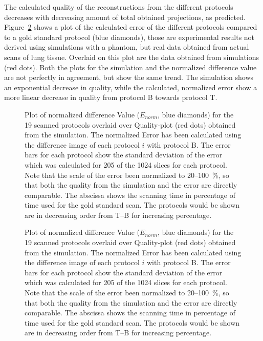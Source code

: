 The calculated quality of the reconstructions from the different protocols decreases with decreasing amount of total obtained projections, as predicted. Figure~\ref{fig:NormalizedErrorPlot} shows a plot of the calculated error of the different protocols compared to a gold standard protocol (blue diamonds), those are experimental results not derived using simulations with a phantom, but real data obtained from actual scans of lung tissue. Overlaid on this plot are the data obtained from simulations (red dots). Both the plots for the simulation and the normalized difference value are not perfectly in agreement, but show the same trend. The simulation shows an exponential decrease in quality, while the calculated, normalized error show a more linear decrease in quality from protocol B towards protocol T.

\ifiucr
	\begin{figure}%
		\centering%
		\caption{Plot of normalized difference Value ($E_{norm}$, blue diamonds) for the 19 scanned protocols overlaid over Quality-plot (red dots) obtained from the simulation. The normalized Error has been calculated using the difference image of each protocol $i$ with protocol B. The error bars for each protocol show the standard deviation of the error which was calculated for 205 of the 1024 slices for each protocol. Note that the scale of the error been normalized to 20--\SI{100}{\percent}, so that both the quality from the simulation and the error are directly comparable. The abscissa shows the scanning time in percentage of time used for the gold standard scan. The protocols would be shown are in decreasing order from T--B for increasing percentage.}%
		\label{fig:NormalizedErrorPlot}%
	\end{figure}%
\else
	\begin{figure}[htp]
		\centering
		
		\caption{Plot of normalized difference Value ($E_{norm}$, blue diamonds) for the 19 scanned protocols overlaid over Quality-plot (red dots) obtained from the simulation. The normalized Error has been calculated using the difference image of each protocol $i$ with protocol B. The error bars for each protocol show the standard deviation of the error which was calculated for 205 of the 1024 slices for each protocol. Note that the scale of the error been normalized to 20--\SI{100}{\percent}, so that both the quality from the simulation and the error are directly comparable. The abscissa shows the scanning time in percentage of time used for the gold standard scan. The protocols would be shown are in decreasing order from T--B for increasing percentage.}%
		\label{fig:NormalizedErrorPlot}
	\end{figure}
\fi

